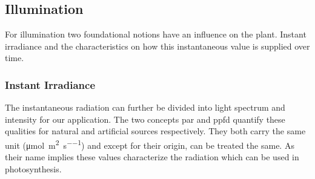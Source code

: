 

\subsection{Illumination}
For illumination two foundational notions have an influence on the plant.
Instant irradiance and the characteristics on how this instantaneous value is supplied over time.


\subsubsection{Instant Irradiance}
The instantaneous radiation can further be divided into light spectrum and intensity for our application.
The two concepts \ac{par} and \ac{ppfd} quantify these qualities for natural and artificial sources respectively.
They both carry the same unit (\si{\umol\per\square\m\per\s}) and except for their origin, can be treated the same.
As their name implies these values characterize the radiation which can be used in photosynthesis.
